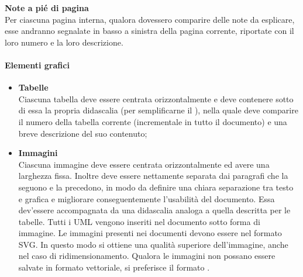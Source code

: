   \textbf{Note a pié di pagina} \\
  Per ciascuna pagina interna, qualora dovessero comparire delle note da esplicare, esse andranno segnalate in
  basso a sinistra della pagina corrente, riportate con il loro numero e la loro descrizione.
	

\paragraph*{Elementi grafici}
\begin{itemize}
	\item \textbf{Tabelle} \\
		Ciascuna tabella deve essere centrata orizzontalmente e deve contenere sotto di essa la propria
		didascalia (per semplificarne il ), nella quale deve comparire il numero della tabella corrente (incrementale in tutto
		il documento) e una breve descrizione del suo contenuto;
	\item \textbf{Immagini} \\
		Ciascuna immagine deve essere centrata orizzontalmente ed avere una larghezza fissa. Inoltre deve
		essere nettamente separata dai paragrafi che la seguono e la precedono, in modo da definire una
		chiara separazione tra testo e grafica e migliorare conseguentemente l'usabilità del documento. Essa dev’essere
		accompagnata da una didascalia analoga a quella descritta per le tabelle. Tutti i 
		UML vengono inseriti nel documento sotto forma di immagine.
	        Le immagini presenti nei documenti devono essere nel formato SVG.
		In questo modo si ottiene una qualità superiore dell'immagine, anche nel caso di ridimensionamento. 
		Qualora le immagini non possano essere salvate in formato vettoriale, si preferisce il formato .

\end{itemize}

